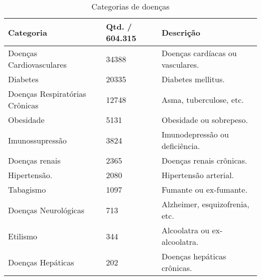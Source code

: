 \begin{table}[H] 
  \centering
  
  \begin{tabular}{lll}
    \hline
    \multicolumn{1}{|l|}{\textbf{Categoria}} & \multicolumn{1}{l|}{\textbf{Qtd. / 604.315}} & \multicolumn{1}{l|}{\textbf{Descrição}}   \\ \hline
    Doenças Cardiovasculares                 & 34388                                        & Doenças cardíacas ou vasculares.        \\
    Diabetes                                 & 20335                                        & Diabetes mellitus.                      \\
    Doenças Respiratórias Crônicas           & 12748                                        & Asma, tuberculose, etc.                 \\
    Obesidade                                & 5131                                         & Obesidade ou sobrepeso.                 \\
    Imunossupressão                           & 3824                                         & Imunodepressão ou deficiência.          \\
    Doenças renais                           & 2365                                         & Doenças renais crônicas.                \\
    Hipertensão.                             & 2080                                         & Hipertensão arterial.                   \\
    Tabagismo                                & 1097                                         & Fumante ou ex-fumante.                  \\
    Doenças Neurológicas                     & 713                                          & Alzheimer, esquizofrenia, etc.          \\
    Etilismo                                 & 344                                          & Alcoolatra ou ex-alcoolatra.            \\
    Doenças Hepáticas                        & 202                                          & Doenças hepáticas crônicas.                  
    \end{tabular}
    \caption{Categorias de doenças}
    \label{tbl:tabela-doencas} 
    \end{table}
